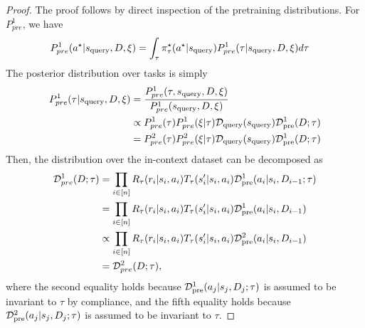 \begin{proof}
    The proof follows by direct inspection of the pretraining distributions. For $P^1_{pre}$, we have
    \begin{align}
         P^1_{pre} ( a^\star | s_{\text{query}}, D, \xi) & = \int_{\tau} \pi^{\star}_\tau(a^\star | s_{\text{query}}) P^1_{pre}(\tau| s_{\text{query}}, D, \xi) d \tau \label{eqn:invariant_tau}
    \end{align}
    The posterior distribution over tasks is simply
    \begin{align}
     P^1_{pre}(\tau| s_{\text{query}}, D, \xi) & = \frac{P^1_{pre}(\tau, s_{\text{query}}, D, \xi)}{P^1_{pre}(s_{\text{query}}, D, \xi)} \\
     & \propto P^1_{pre}(\tau) P^1_{pre} (\xi | \tau)  \mathcal{D}_{\text{query}}(s_{\text{query}}) \mathcal{D}_{\text{pre}}^1 (D ; \tau) \\
     & = P^2_{pre}(\tau) P^2_{pre} (\xi | \tau)  \mathcal{D}_{\text{query}}(s_{\text{query}}) \mathcal{D}_{\text{pre}}^1 (D ; \tau)
    \end{align}
    Then, the distribution over the in-context dataset can be decomposed as
    \begin{align}
        \Dcal^1_{pre} (D ; \tau) & = \prod_{i \in [n]} R_\tau(r_i | s_i, a_i) T_\tau(s'_i | s_i, a_i) \pretraind^1( a_i | s_i, D_{i - 1}; \tau) \\
        & = \prod_{i \in [n]} R_\tau(r_i | s_i, a_i) T_\tau(s'_i | s_i, a_i) \pretraind^1( a_i | s_i, D_{i - 1}) \\
        & \propto \prod_{i \in [n]} R_\tau(r_i | s_i, a_i) T_\tau(s'_i | s_i, a_i) \pretraind^2( a_i | s_i, D_{i - 1}) \\ %
        & =  \Dcal^2_{pre} (D ; \tau),
    \end{align}
    where the second equality holds because $\mathcal{D}_{\text{pre}}^1(a_j|s_j,D_j; \tau)$ is assumed to be invariant to $\tau$ by compliance, and the fifth equality holds because $\mathcal{D}_{\text{pre}}^2(a_j|s_j,D_j; \tau)$ is assumed to be invariant to $\tau$. 
    

\end{proof}
